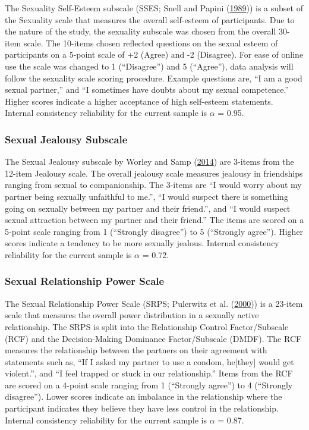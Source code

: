\documentclass[
  donotrepeattitle,doc, 12pt, a4paper,floatsintext]{apa7}
\begin{document}
The Sexuality Self-Esteem subscale (SSES; Snell and Papini (\protect\hyperlink{ref-snell1989}{1989})) is a subset of the Sexuality scale that measures the overall self-esteem of participants. Due to the nature of the study, the sexuality subscale was chosen from the overall 30-item scale. The 10-items chosen reflected questions on the sexual esteem of participants on a 5-point scale of +2 (Agree) and -2 (Disagree). For ease of online use the scale was changed to 1 (``Disagree'') and 5 (``Agree''), data analysis will follow the sexuality scale scoring procedure. Example questions are, ``I am a good sexual partner,'' and ``I sometimes have doubts about my sexual competence.'' Higher scores indicate a higher acceptance of high self-esteem statements. Internal consistency reliability for the current sample is \(\alpha\) = 0.95.

\hypertarget{sexual-jealousy-subscale}{%
\subsubsection{Sexual Jealousy Subscale}\label{sexual-jealousy-subscale}}

The Sexual Jealousy subscale by Worley and Samp (\protect\hyperlink{ref-worley2014}{2014}) are 3-items from the 12-item Jealousy scale. The overall jealousy scale measures jealousy in friendships ranging from sexual to companionship. The 3-items are ``I would worry about my partner being sexually unfaithful to me.'', ``I would suspect there is something going on sexually between my partner and their friend.'', and ``I would suspect sexual attraction between my partner and their friend.'' The items are scored on a 5-point scale ranging from 1 (``Strongly disagree'') to 5 (``Strongly agree''). Higher scores indicate a tendency to be more sexually jealous. Internal consistency reliability for the current sample is \(\alpha\) = 0.72.

\hypertarget{sexual-relationship-power-scale}{%
\subsubsection{Sexual Relationship Power Scale}\label{sexual-relationship-power-scale}}

The Sexual Relationship Power Scale (SRPS; Pulerwitz et al. (\protect\hyperlink{ref-pulerwitz2000}{2000})) is a 23-item scale that measures the overall power distribution in a sexually active relationship. The SRPS is split into the Relationship Control Factor/Subscale (RCF) and the Decision-Making Dominance Factor/Subscale (DMDF). The RCF measures the relationship between the partners on their agreement with statements such as, ``If I asked my partner to use a condom, he{[}they{]} would get violent.'', and ``I feel trapped or stuck in our relationship.'' Items from the RCF are scored on a 4-point scale ranging from 1 (``Strongly agree'') to 4 (``Strongly disagree''). Lower scores indicate an imbalance in the relationship where the participant indicates they believe they have less control in the relationship. Internal consistency reliability for the current sample is \(\alpha\) = 0.87.
\end{document}
